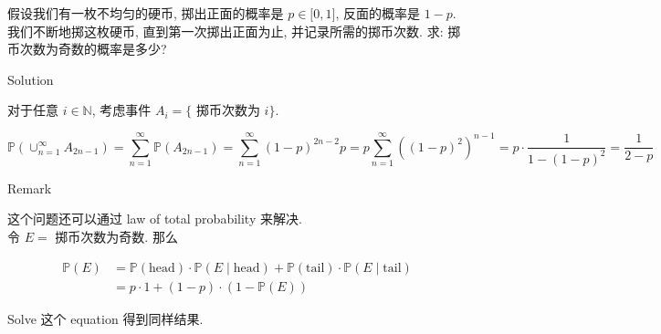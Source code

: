 \documentclass{qlnotes-export}
\begin{document}
\begin{example}

假设我们有一枚不均匀的硬币, 掷出正面的概率是 \(p \in \lbrack 0,1\rbrack\), 反面的概率是 \(1 - p\). 我们不断地掷这枚硬币, 直到第一次掷出正面为止, 并记录所需的掷币次数. 求: 掷币次数为奇数的概率是多少?

\begin{qlsolution}{Solution}

对于任意 \(i \in {\mathbb{N}}\), 考虑事件 \(A_{i} = \{\) 掷币次数为 \(i\}\).

\[{\mathbb{P}}\left( {\cup_{n = 1}^{\infty}A_{2n - 1}} \right) = \sum\limits_{n = 1}^{\infty}{\mathbb{P}}\left( A_{2n - 1} \right) = \sum\limits_{n = 1}^{\infty}(1 - p)^{2n - 2}p = p\sum\limits_{n = 1}^{\infty}\left( {(1 - p)^{2}} \right)^{n - 1} = p \cdot \frac{1}{1 - (1 - p)^{2}} = \frac{1}{2 - p}\]

\end{qlsolution}

\begin{qlremark}{Remark}

这个问题还可以通过 law of total probability 来解决.\\
令 \(E =\) 掷币次数为奇数. 那么

\[\begin{matrix}
{{\mathbb{P}}(E)} & {= {\mathbb{P}}(\text{head}) \cdot {\mathbb{P}}(E \mid \text{head}) + {\mathbb{P}}(\text{tail}) \cdot {\mathbb{P}}(E \mid \text{tail})} \\
 & {= p \cdot 1 + (1 - p) \cdot (1 - {\mathbb{P}}(E))}
\end{matrix}\]

Solve 这个 equation 得到同样结果.

\end{qlremark}

\end{example}
\end{document}
